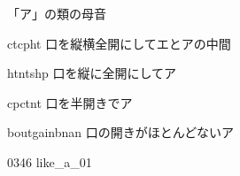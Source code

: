 \documentclass[aspectratio=169, xcolor={dvipsnames,table}]{beamer}
\begin{document}
\begin{frame}[plain]{「ア」の類の母音}
  \Large

  \pause
  \begin{description}[<+- |alert@+>]
    \item[\textipa{/\ae /}] ct\hspace{20pt}cp\hspace{20pt}ht%
          \hfill{}{\small 口を縦横全開にしてエとアの中間}

    \item[\textipa{/\textscripta /}] ht\hspace{20pt}nt\hspace{20pt}shp%
          \hfill{}{\small 口を縦に全開にしてア}

    \item[\textipa{/\textturnv /}] cp\hspace{20pt}ct\hspace{20pt}nt%
          \hfill{}{\small 口を半開きでア}

    \item[\textipa{/\textschwa /}] bout\hspace{20pt}gain\hspace{20pt}bnan%
          \hfill{}{\small 口の開きがほとんどないア}
  \end{description}

  \hfill{\tiny 0346}\,{\scriptsize {}\,{\tiny like\_a\_01}}

\end{frame}
\end{document}
